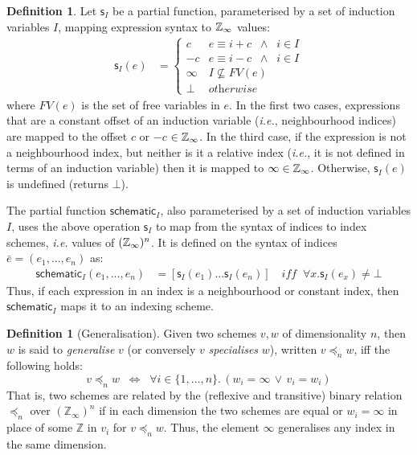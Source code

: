 \documentclass[10pt,preprint]{sigplanconf}
\newcounter{block}
\theoremstyle{definition}
\newtheorem{definition}[block]{Definition}
\newcommand{\ie}{\emph{i.e.}}
\begin{document}
\newcommand{\schemeOne}{\textsf{s}_I}
\newcommand{\schemeN}{\textsf{schematic}_I}
\begin{definition}%
\label{def:schematic}
Let $\schemeOne$ be a partial function, parameterised by a set of
induction variables $I$, mapping expression syntax to
$\mathbb{Z}_\infty$ values:
\begin{align*}
\schemeOne(e)
 & =  \begin{cases}
c & e \equiv i + c \;\; \wedge \;\; i \in I \\
-c & e \equiv i - c \;\; \wedge \;\; i \in I \\
\infty & \textit{$I \not\subseteq \textit{FV}(e)$} \\
\bot   & \textit{otherwise}
\end{cases}
\end{align*}
where $\textit{FV}(e)$ is the set of free variables in $e$. In the
first two cases, expressions that are a constant offset of an
induction variable (\ie{}, neighbourhood indices) are mapped to the
offset $c$ or $-c$ $\in \mathbb{Z}_\infty$. In the third case, if the
expression is not a neighbourhood index, but neither is it a relative
index (\ie{}, it is not defined in terms of an induction variable) then it
is mapped to $\infty \in \mathbb{Z}_\infty{}$. Otherwise, $\schemeOne(e)$
is undefined (returns $\bot$).

The partial function $\schemeN$, also parameterised by a set of
induction variables $I$, uses the above operation $\schemeOne$ to
 map from the syntax of indices to index schemes, \ie{} values of
$(\mathbb{Z}_\infty)^n$. It is defined on the syntax of indices $\bar{e} = (e_1, ..., e_n)$ as:
\begin{align*}
\schemeN(e_1, ..., e_n) & =
[\schemeOne(e_1) ... \schemeOne(e_n) ]
\quad \textit{iff} \;\; \forall x . \schemeOne(e_x) \neq \bot
\end{align*}
%
Thus, if each expression in an index is a neighbourhood or constant
index, then $\schemeN$ maps it to an indexing scheme.
\end{definition}

\begin{definition}[Generalisation]
Given two schemes $v, w$ of dimensionality $n$,
then $w$ is said to \emph{generalise} $v$
(or conversely $v$ \emph{specialises} $w$),
written $v \preceq_n w$, iff the following holds:
\[
v \preceq_n w \;\; \Leftrightarrow  \;\;
  \forall i\!\in\!\{ 1, \ldots, n \} . \, (w_i = \infty \, \vee \, v_i = w_i)
\]
That is, two schemes are related by the (reflexive and transitive) binary relation
$\preceq_n$ over $(\mathbb{Z}_{\infty})^n$ if in each dimension
the two schemes are equal or $w_i = \infty$
in place of some $\mathbb{Z}$ in $v_i$ for $v \preceq_n w$.
Thus, the element $\infty$ generalises any index in the same dimension.
%
\end{definition}
\end{document}
